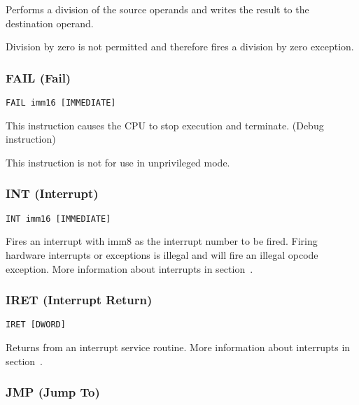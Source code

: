 
Performs a division of the source operands and writes the result to the destination operand.


Division by zero is not permitted and therefore fires a division by zero exception.


\subsubsection{FAIL (Fail) }

\begin{verbatim}
FAIL imm16 [IMMEDIATE]
\end{verbatim}


This instruction causes the CPU to stop execution and terminate. (Debug instruction)


This instruction is not for use in unprivileged mode.

\subsubsection{INT (Interrupt)}

\begin{verbatim}
INT imm16 [IMMEDIATE]

\end{verbatim}


Fires an interrupt with imm8 as the interrupt number to be fired. Firing hardware interrupts or exceptions is illegal and will fire an illegal opcode exception.
More information about interrupts in section~.

\subsubsection{IRET (Interrupt Return)}

\begin{verbatim}
IRET [DWORD]
\end{verbatim}


Returns from an interrupt service routine. More information about interrupts in section~.

\subsubsection{JMP (Jump To)}

